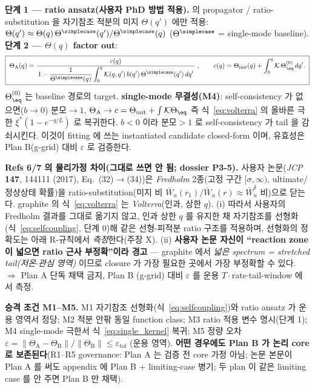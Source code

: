 \textbf{단계 1 — ratio ansatz(사용자 PhD 방법 적용).} \cite{lee2011,son2013} 의 propagator /
ratio-substitution 을 자기참조 적분의 미지 $\Theta(q')$ 에만 적용:
$\Theta(q')\approx\Theta(q)\,\Theta^\simplecase(q')/\Theta^\simplecase(q)$ ($\Theta^\simplecase$ =
single-mode baseline). \textbf{단계 2 — $\Theta(q)$ factor out}:
\begin{equation}
\boxed{\;\Theta_\mathrm A(q)=\frac{c(q)}
{\,1-\dfrac{1}{\Theta^\simplecase(q)}\displaystyle\int_0^q\mathcal K(q,q')\,b(q')\,\Theta^\simplecase(q')\,dq'\,}\;,
\qquad c(q)=\Theta_\mathrm{init}(q)+\int_0^q\mathcal K\,\Theta_\eq^{(0)}\,dq'.\;}
\label{eq:closed}
\end{equation}
$\Theta_\eq^{(0)}$ 는 baseline 경로의 target. \textbf{single-mode 무결성(M4)}: self-consistency 가
없으면($b\to0$) 분모$\to1$, $\Theta_\mathrm A\to c=\Theta_\mathrm{init}+\int\mathcal K\Theta_\eq$ 즉
식~\eqref{eq:volterra} 의 올바른 극한 $\xi^\ast(1-e^{-q/L})$ 로 복귀한다. $b<0$ 이라 분모$>1$ 로
self-consistency 가 tail 을 감쇠시킨다. 이것이 fitting 에 쓰는 instantiated candidate closed-form 이며,
유효성은 Plan B(g-grid) 대비 $\varepsilon$ 로 검증한다.
\begin{boundbox}
\textbf{Refs 6/7 의 물리가정 차이(그대로 쓰면 안 됨; dossier P3-5).} 사용자 논문(\emph{JCP} \textbf{147},
144111 (2017), Eq.\ (32)$\to$(34))은 \emph{Fredholm} 2종(고정 구간 $[\sigma,\infty)$, ultimate/정상상태
확률)을 ratio-substitution(미지 비 $\bar W_u(r_1)/\bar W_u(r)\approx\bar W_u^\delta$ 비)으로 닫는다.
graphite 의 식~\eqref{eq:volterra} 는 \emph{Volterra}(인과, 상한 $q$). (i) 따라서 사용자의 Fredholm
결과를 그대로 옮기지 않고, 인과 상한 $q$ 를 유지한 채 자기참조를 선형화(식~\eqref{eq:selfcoupling}, 단계 0)해
같은 선형-피적분 ratio 구조를 적용하며, 선형화의 정확도는 아래 R-규칙에서 \emph{측정}한다(주장 X).
(ii) \textbf{사용자 논문 자신이 ``reaction zone 이 넓으면 ratio 근사
부정확''이라 경고} — graphite 에서 \emph{넓은 spectrum = stretched tail(저온$\cdot$관심 영역)} 이므로
closure 가 가장 필요한 곳에서 가장 부정확할 수 있다. $\Rightarrow$ Plan A 단독 채택 금지, Plan B
(g-grid) 대비 $\varepsilon$ 를 운용 $T\cdot$rate$\cdot$tail-window 에서 측정.
\end{boundbox}
\textbf{승격 조건 M1--M5.} M1 자기참조 선형화(식~\eqref{eq:selfcoupling})와 ratio ansatz 가 운용 영역서 정당; M2 적분 안팎 동일 function class;
M3 ratio 적용 변수 명시(단계 1); M4 single-mode 극한서 식~\eqref{eq:single_kernel} 복귀; M5 정량 오차
$\varepsilon=\lVert\Theta_\mathrm A-\Theta_\mathrm B\rVert/\lVert\Theta_\mathrm B\rVert\le\varepsilon_\mathrm{tol}$
(운용 영역). \textbf{어떤 경우에도 Plan B 가 논리 core 로 보존된다}(R1--R5 governance: Plan A 는 검증 전
core 가정 아님; 논문 본문이 Plan A 를 써도 appendix 에 Plan B + limiting-case 병기; 두 plan 이 같은
limiting case 를 안 주면 Plan B 만 채택).

